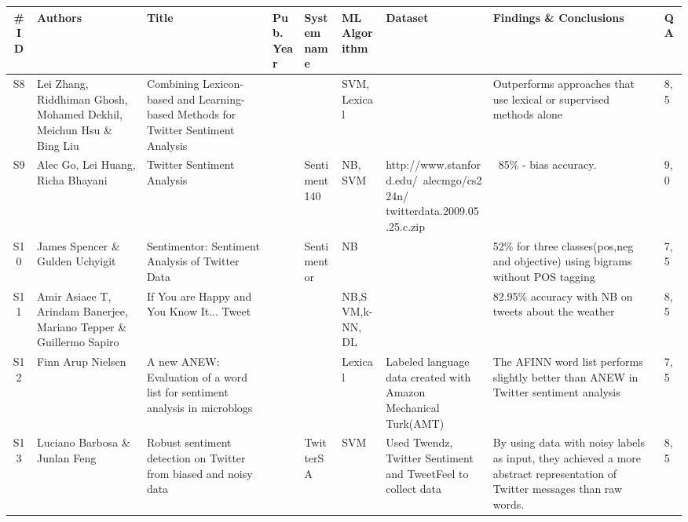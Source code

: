 \begin{sidewaystable}
    \centering
	\caption{Data extraction step, table 2/4. Showing data as per defined in the SLRP in appendix~\autoref{apx:slrp}}
	\label{tab:extraction2}
    \scriptsize
    \begin{longtable}{|c|p{3cm}|p{4cm}|p{0.6cm}|p{1cm}|p{1.3cm}|p{4cm}|p{3cm}|p{0.3cm}|} 
    
    \hline
    \textbf{\#ID} & \textbf{Authors} & \textbf{Title} & \textbf{Pub. Year} & \textbf{System name} & \textbf{ML Algorithm} & \textbf{Dataset} & \textbf{Findings} \& \textbf{Conclusions} & \textbf{QA} \\ 
    \hline
    
    S8 & Lei Zhang, Riddhiman Ghosh, Mohamed Dekhil, Meichun Hsu \& Bing Liu & Combining Lexicon-based and Learning-based Methods for Twitter Sentiment Analysis & \citeyear{zhang2011combining} &  & SVM, Lexical &  & Outperforms approaches that use lexical or supervised methods alone  & 8,5 \\ \hline  
    
    
    S9 & Alec Go, Lei Huang, Richa Bhayani & Twitter Sentiment Analysis & \citeyear{article:go} & Sentiment140 & NB, SVM & http://www.stanford.edu/~alecmgo/cs224n/ twitterdata.2009.05.25.c.zip & ~85\% - bias accuracy.  & 9,0  \\ \hline  
    
    S10 & James Spencer \& Gulden Uchyigit & Sentimentor: Sentiment Analysis of Twitter Data & \citeyear{spencer2012sentimentor} & Sentimentor & NB &  & 52\% for three classes(pos,neg and objective) using bigrams without POS tagging  & 7,5 \\ \hline  
    
    S11 & Amir Asiaee T, Arindam Banerjee, Mariano Tepper \& Guillermo Sapiro  & If You are Happy and You Know It... Tweet & \citeyear{asiaee2012if} &  & NB,SVM,k-NN, DL &  & 82.95\% accuracy with NB on tweets about the weather  & 8,5 \\ \hline  
    
    S12 & Finn Arup Nielsen & A new ANEW: Evaluation of a word list for sentiment analysis in microblogs & \citeyear{article:afinn} &  & Lexical & Labeled language data created with Amazon Mechanical Turk(AMT) & The AFINN word list performs slightly better than ANEW in Twitter sentiment analysis  & 7,5 \\ \hline  
    
    S13 & Luciano Barbosa \& Junlan Feng & Robust sentiment detection on Twitter from biased and noisy data & \citeyear{barbosa2010robust} & TwitterSA & SVM & Used Twendz, Twitter Sentiment and TweetFeel to collect data & By using data with noisy labels as input, they achieved a more abstract representation of Twitter messages than raw words.  & 8,5 \\ \hline  
    
    \end{longtable}
\end{sidewaystable}

